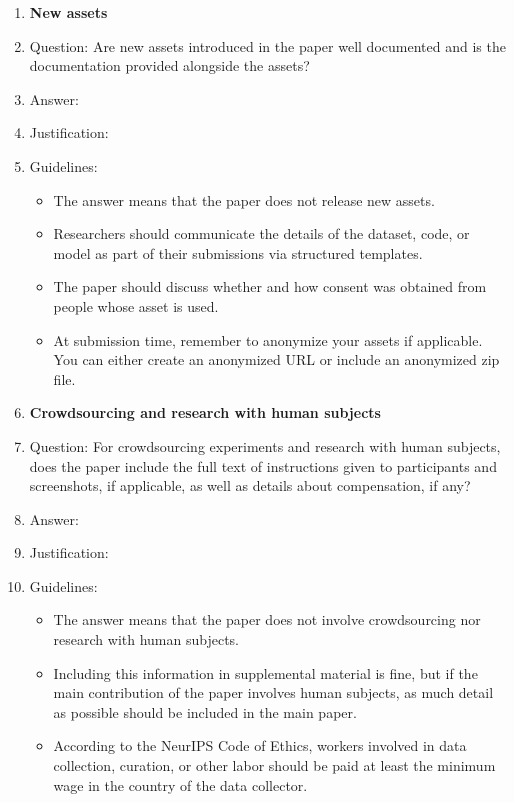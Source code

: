 \begin{enumerate}
\item {\bf New assets}
    \item[] Question: Are new assets introduced in the paper well documented and is the documentation provided alongside the assets?
    \item[] Answer: \answerTODO{}
    \item[] Justification: \justificationTODO{}
    \item[] Guidelines:
    \begin{itemize}
        \item The answer \answerNA{} means that the paper does not release new assets.
        \item Researchers should communicate the details of the dataset, code, or model as part of their submissions via structured templates.
        \item The paper should discuss whether and how consent was obtained from people whose asset is used.
        \item At submission time, remember to anonymize your assets if applicable. You can either create an anonymized URL or include an anonymized zip file.
    \end{itemize}

\item {\bf Crowdsourcing and research with human subjects}
    \item[] Question: For crowdsourcing experiments and research with human subjects, does the paper include the full text of instructions given to participants and screenshots, if applicable, as well as details about compensation, if any?
    \item[] Answer: \answerTODO{}
    \item[] Justification: \justificationTODO{}
    \item[] Guidelines:
    \begin{itemize}
        \item The answer \answerNA{} means that the paper does not involve crowdsourcing nor research with human subjects.
        \item Including this information in supplemental material is fine, but if the main contribution of the paper involves human subjects, as much detail as possible should be included in the main paper.
        \item According to the NeurIPS Code of Ethics, workers involved in data collection, curation, or other labor should be paid at least the minimum wage in the country of the data collector.
    \end{itemize}


\end{enumerate}

